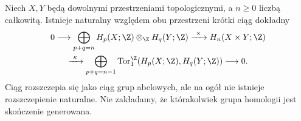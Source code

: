 \begin{twierdzenie}
\label{thm:kunneth-v4}
Niech $X,Y$ będą dowolnymi przestrzeniami topologicznymi,
a $n\geq0$ liczbą całkowitą.
Istnieje naturalny względem obu przestrzeni krótki ciąg dokładny
\[
\begin{gathered}
0\longrightarrow
\bigoplus_{p+q=n}H_p(X;\Z)\otimes_\Z H_q(Y;\Z)
\xrightarrow{\ \times\ }H_n(X\times Y;\Z)\\
\xrightarrow{\ \kappa\ }
\bigoplus_{p+q=n-1}\operatorname{Tor}^{\Z}_1(H_p(X;\Z),H_q(Y;\Z))
\longrightarrow0.
\end{gathered}
\]
Ciąg rozszczepia się jako ciąg grup abelowych, ale na ogół nie istnieje
rozszczepienie naturalne. Nie zakładamy, że którakolwiek grupa homologii
jest skończenie generowana.
\end{twierdzenie}
